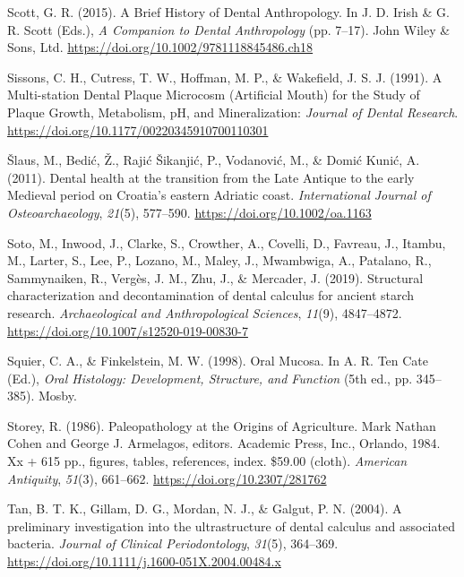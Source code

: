\documentclass[
  b5paper,
]{book}
\newlength{\cslhangindent}
\newlength{\cslentryspacingunit} %
\newenvironment{CSLReferences}[2] %
 {%
  \setlength{\parindent}{0pt}
  \ifodd #1
  \let\oldpar\par
  \def\par{\hangindent=\cslhangindent\oldpar}
  \fi
  \setlength{\parskip}{#2\cslentryspacingunit}
 }%
 {}
\begin{document}
\begin{CSLReferences}{1}{0}
\leavevmode{}%
Scott, G. R. (2015). A {Brief History} of {Dental Anthropology}. In J.
D. Irish \& G. R. Scott (Eds.), \emph{A {Companion} to {Dental
Anthropology}} (pp. 7--17). {John Wiley \& Sons, Ltd}.
\url{https://doi.org/10.1002/9781118845486.ch18}

\leavevmode{}%
Sissons, C. H., Cutress, T. W., Hoffman, M. P., \& Wakefield, J. S. J.
(1991). A {Multi-station Dental Plaque Microcosm} ({Artificial Mouth})
for the {Study} of {Plaque Growth}, {Metabolism}, {pH}, and
{Mineralization}: \emph{Journal of Dental Research}.
\url{https://doi.org/10.1177/00220345910700110301}

\leavevmode{}%
Šlaus, M., Bedić, Ž., Rajić Šikanjić, P., Vodanović, M., \& Domić Kunić,
A. (2011). Dental health at the transition from the {Late Antique} to
the early {Medieval} period on {Croatia}'s eastern {Adriatic} coast.
\emph{International Journal of Osteoarchaeology}, \emph{21}(5),
577--590. \url{https://doi.org/10.1002/oa.1163}

\leavevmode{}%
Soto, M., Inwood, J., Clarke, S., Crowther, A., Covelli, D., Favreau,
J., Itambu, M., Larter, S., Lee, P., Lozano, M., Maley, J., Mwambwiga,
A., Patalano, R., Sammynaiken, R., Vergès, J. M., Zhu, J., \& Mercader,
J. (2019). Structural characterization and decontamination of dental
calculus for ancient starch research. \emph{Archaeological and
Anthropological Sciences}, \emph{11}(9), 4847--4872.
\url{https://doi.org/10.1007/s12520-019-00830-7}

\leavevmode{}%
Squier, C. A., \& Finkelstein, M. W. (1998). Oral {Mucosa}. In A. R. Ten
Cate (Ed.), \emph{Oral {Histology}: {Development}, {Structure}, and
{Function}} (5th ed., pp. 345--385). {Mosby}.

\leavevmode{}%
Storey, R. (1986). Paleopathology at the {Origins} of {Agriculture}.
{Mark Nathan Cohen} and {George J}. {Armelagos}, editors. {Academic
Press}, {Inc}., {Orlando}, 1984. Xx + 615 pp., figures, tables,
references, index. \$59.00 (cloth). \emph{American Antiquity},
\emph{51}(3), 661--662. \url{https://doi.org/10.2307/281762}

\leavevmode{}%
Tan, B. T. K., Gillam, D. G., Mordan, N. J., \& Galgut, P. N. (2004). A
preliminary investigation into the ultrastructure of dental calculus and
associated bacteria. \emph{Journal of Clinical Periodontology},
\emph{31}(5), 364--369.
\url{https://doi.org/10.1111/j.1600-051X.2004.00484.x}


\end{CSLReferences}
\end{document}
